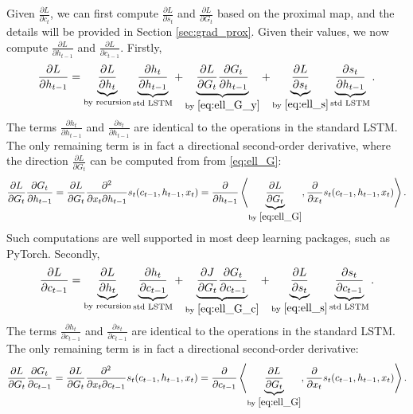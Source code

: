 Given $\frac{\partial L}{\partial c_{t}}$, we can first compute 
$\frac{\partial L}{\partial s_t}$ and $\frac{\partial L}{\partial G_t}$ based on the proximal map,
and the details will be provided in Section \ref{sec:grad_prox}.
Given their values,
we now compute
$\frac{\partial L}{\partial h_{t-1}}$ and 
$\frac{\partial L}{\partial c_{t-1}}$.
Firstly,
%
\begin{align}
\label{eq:rec_ell_y}
\frac{\partial L}{\partial h_{t-1}} = 
\underbrace{\frac{\partial L}{\partial h_t}}_{\text{by recursion}}
\underbrace{\frac{\partial h_t}{\partial h_{t-1}}}_{\text{std LSTM}}
+ \underbrace{\frac{\partial L}{\partial G_t} \frac{\partial G_t}{\partial h_{t-1}}}_{\text{by }\eqref{eq:ell_G_y}}
+ \underbrace{\frac{\partial L}{\partial s_t}}_{\text{by } \eqref{eq:ell_s}}
\underbrace{\frac{\partial s_t}{\partial h_{t-1}}}_{\text{std LSTM}}.
\end{align}
The terms $\frac{\partial h_t}{\partial h_{t-1}}$ and $\frac{\partial s_t}{\partial h_{t-1}}$ are identical to the operations in the standard LSTM.
The only remaining term is in fact a directional second-order derivative,
where the direction $\frac{\partial L}{\partial G_t}$ can be computed from from \eqref{eq:ell_G}:
\begin{align}
\label{eq:ell_G_y}
\frac{\partial L}{\partial G_t} \frac{\partial G_t}{\partial h_{t-1}} =
\frac{\partial L}{\partial G_t} \frac{\partial^2 }{\partial x_t \partial h_{t-1}} s_t(c_{t-1}, h_{t-1}, x_t)
= \frac{\partial}{\partial h_{t-1}} \left\langle \underbrace{\frac{\partial L}{\partial G_t}}_{\text{by } \eqref{eq:ell_G}},\frac{\partial}{\partial x_t} s_t(c_{t-1}, h_{t-1}, x_t) \right\rangle.
\end{align}
Such computations are well supported in most deep learning packages, such as PyTorch.
Secondly, 
\begin{align}
\label{eq:rec_ell_c}
\frac{\partial L}{\partial c_{t-1}} = 
\underbrace{\frac{\partial L}{\partial h_t}}_{\text{by recursion}}
\underbrace{\frac{\partial h_t}{\partial c_{t-1}}}_{\text{std LSTM}}
+ \underbrace{\frac{\partial J}{\partial G_t} \frac{\partial G_t}{\partial c_{t-1}}}_{\text{by }\eqref{eq:ell_G_c}}
+ \underbrace{\frac{\partial L}{\partial s_t}}_{\text{by } \eqref{eq:ell_s}}
\underbrace{\frac{\partial s_t}{\partial c_{t-1}}}_{\text{std LSTM}}.
\end{align}
The terms $\frac{\partial h_t}{\partial c_{t-1}}$ and $\frac{\partial s_t}{\partial c_{t-1}}$ are identical to the operations in the standard LSTM.
The only remaining term is in fact a directional second-order derivative:
\begin{align}
\label{eq:ell_G_c}
\frac{\partial L}{\partial G_t} \frac{\partial G_t}{\partial c_{t-1}} =
\frac{\partial L}{\partial G_t} \frac{\partial^2 }{\partial x_t \partial c_{t-1}} s_t(c_{t-1}, h_{t-1}, x_t)
= \frac{\partial}{\partial c_{t-1}} \left\langle \underbrace{\frac{\partial L}{\partial G_t}}_{\text{by } \eqref{eq:ell_G}},\frac{\partial}{\partial x_t} s_t(c_{t-1}, h_{t-1}, x_t) \right\rangle.
\end{align}


